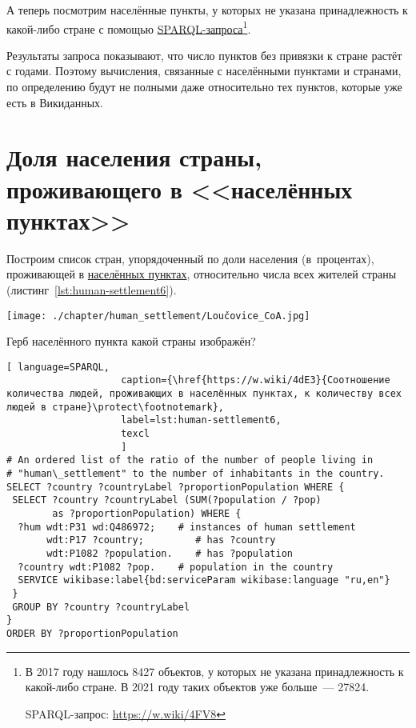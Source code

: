 А теперь посмотрим населённые пункты, 
у которых не указана принадлежность к какой-либо стране 
с помощью \href{https://w.wiki/4FV8}{SPARQL-запроса}\footnote{%
%
В 2017 году нашлось \num{8427} объектов, у которых не указана принадлежность к какой-либо стране. 
В 2021 году таких объектов уже больше~--- \num{27824}. 

SPARQL-запрос: \href{https://w.wiki/4FV8}{https://w.wiki/4FV8}%
}. 

Результаты запроса показывают, что число пунктов без привязки к стране растёт с годами. 
Поэтому вычисления, связанные с населёнными пунктами и странами, 
по определению будут не полными даже относительно тех пунктов, которые уже есть в Викиданных. 


\section{Доля населения страны, проживающего в <<населённых пунктах>>}

Построим список стран, 
упорядоченный по доли населения (в~процентах), проживающей в \href{http://www.wikidata.org/entity/Q486972}{населённых пунктах}, относительно числа всех жителей страны (листинг~\ref{lst:human-settlement6}).
%
\begin{marginfigure}[0.0cm]
{\texttt{[image: ./chapter/human\_settlement/Loučovice\_CoA.jpg]}}
  \caption{Герб населённого пункта какой страны изображён?}%
  \label{fig:flag_question_human_settlements3}%
\end{marginfigure}

\begin{lstlisting}[ language=SPARQL, 
                    caption={\href{https://w.wiki/4dE3}{Соотношение количества людей, проживающих в населённых пунктах, к количеству всех людей в стране}\protect\footnotemark},
                    label=lst:human-settlement6,
                    texcl 
                    ]
# An ordered list of the ratio of the number of people living in 
# "human\_settlement" to the number of inhabitants in the country.
SELECT ?country ?countryLabel ?proportionPopulation WHERE {
 SELECT ?country ?countryLabel (SUM(?population / ?pop) 
        as ?proportionPopulation) WHERE {
  ?hum wdt:P31 wd:Q486972;    # instances of human settlement  
       wdt:P17 ?country;         # has ?country 
       wdt:P1082 ?population.    # has ?population
  ?country wdt:P1082 ?pop.    # population in the country
  SERVICE wikibase:label{bd:serviceParam wikibase:language "ru,en"}
 }
 GROUP BY ?country ?countryLabel
}
ORDER BY ?proportionPopulation
\end{lstlisting}%

